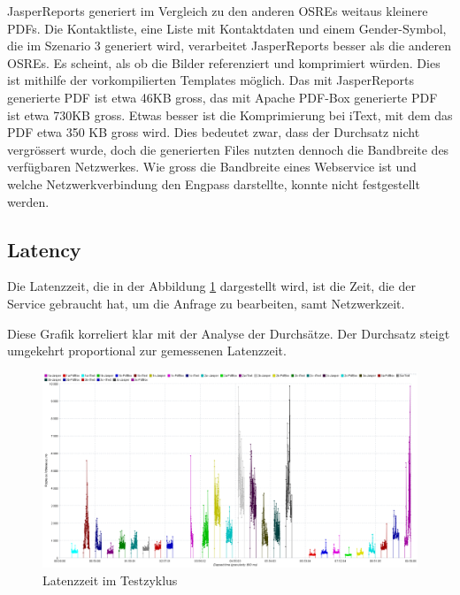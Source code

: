 \documentclass[main.tex]{subfiles}
\begin{document}
JasperReports generiert im Vergleich zu den anderen OSREs weitaus kleinere PDFs. Die Kontaktliste, eine Liste mit Kontaktdaten und einem Gender-Symbol, die im Szenario 3 generiert wird, verarbeitet JasperReports besser als die anderen OSREs. Es scheint, als ob die Bilder referenziert und komprimiert würden. Dies ist mithilfe der vorkompilierten Templates möglich. Das mit JasperReports generierte PDF ist etwa 46KB gross, das mit Apache PDF-Box generierte PDF ist etwa 730KB gross. Etwas besser ist die Komprimierung bei iText, mit dem das PDF etwa 350 KB gross wird. 
Dies bedeutet zwar, dass der Durchsatz nicht vergrössert wurde, doch die generierten Files nutzten dennoch die Bandbreite des verfügbaren Netzwerkes. Wie gross die Bandbreite eines Webservice ist und welche Netzwerkverbindung den Engpass darstellte, konnte nicht festgestellt werden. 


\subsection{Latency}
Die Latenzzeit, die in der Abbildung \ref{figure:latencyTestcycle} dargestellt wird, ist die Zeit, die der Service gebraucht hat, um die Anfrage zu bearbeiten, samt Netzwerkzeit. 

Diese Grafik korreliert klar mit der Analyse der Durchsätze. Der Durchsatz steigt umgekehrt proportional zur gemessenen Latenzzeit.

\begin{figure}[!ht]
\includegraphics[width=\textwidth]{mainpart/4_analyse_img/ResponseLatenciesOverTime.png}
 \caption{Latenzzeit im Testzyklus}
 \label{figure:latencyTestcycle}
\end{figure}
\end{document}
